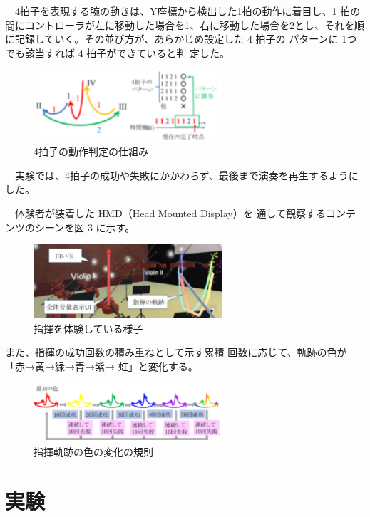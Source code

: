 \documentclass[uplatex]{jsarticle}   %
\begin{document}
　4拍子を表現する腕の動きは、Y座標から検出した1拍の動作に着目し、1 拍の間にコントローラが左に移動した場合を1、右に移動した場合を2とし、それを順に記録していく。その並び方が、あらかじめ設定した 4 拍子の パターンに 1つでも該当すれば 4 拍子ができていると判 定した。

 \begin{figure}[H]
 \centering
 \includegraphics[clip,width=7cm]{hyousi.png}
 \caption{4拍子の動作判定の仕組み}\label{fig:hoge}
\end{figure}
 
　実験では、4拍子の成功や失敗にかかわらず、最後まで演奏を再生するようにした。 

　体験者が装着した HMD（Head Mounted Display）を 通して観察するコンテンツのシーンを図 3 に示す。

 \begin{figure}[H]
 \centering
 \includegraphics[clip,width=7cm]{sikumi.png}
 \caption{指揮を体験している様子}\label{fig:hoge}
\end{figure}

また、指揮の成功回数の積み重ねとして示す累積 回数に応じて、軌跡の色が「赤→黄→緑→青→紫→ 虹」と変化する。

\begin{figure}[H]
 \centering
 \includegraphics[clip,width=7cm]{sikisikumi.png}
 \caption{指揮軌跡の色の変化の規則}\label{fig:hoge}
\end{figure}



\section{実験}
\end{document}

